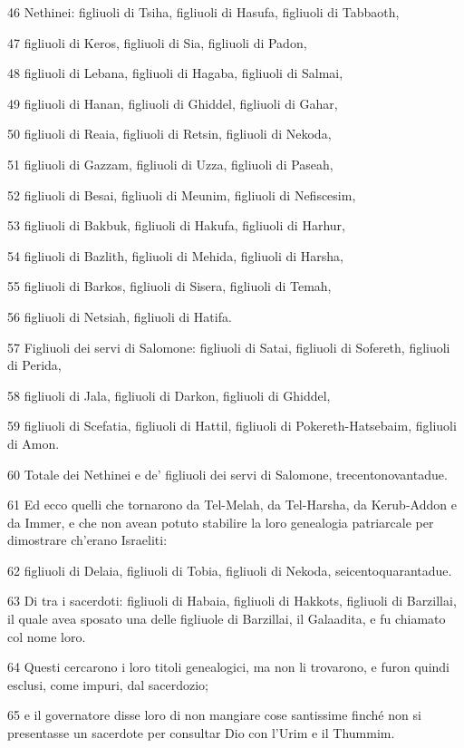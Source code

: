 \par 46 Nethinei: figliuoli di Tsiha, figliuoli di Hasufa, figliuoli di Tabbaoth,
\par 47 figliuoli di Keros, figliuoli di Sia, figliuoli di Padon,
\par 48 figliuoli di Lebana, figliuoli di Hagaba, figliuoli di Salmai,
\par 49 figliuoli di Hanan, figliuoli di Ghiddel, figliuoli di Gahar,
\par 50 figliuoli di Reaia, figliuoli di Retsin, figliuoli di Nekoda,
\par 51 figliuoli di Gazzam, figliuoli di Uzza, figliuoli di Paseah,
\par 52 figliuoli di Besai, figliuoli di Meunim, figliuoli di Nefiscesim,
\par 53 figliuoli di Bakbuk, figliuoli di Hakufa, figliuoli di Harhur,
\par 54 figliuoli di Bazlith, figliuoli di Mehida, figliuoli di Harsha,
\par 55 figliuoli di Barkos, figliuoli di Sisera, figliuoli di Temah,
\par 56 figliuoli di Netsiah, figliuoli di Hatifa.
\par 57 Figliuoli dei servi di Salomone: figliuoli di Satai, figliuoli di Sofereth, figliuoli di Perida,
\par 58 figliuoli di Jala, figliuoli di Darkon, figliuoli di Ghiddel,
\par 59 figliuoli di Scefatia, figliuoli di Hattil, figliuoli di Pokereth-Hatsebaim, figliuoli di Amon.
\par 60 Totale dei Nethinei e de' figliuoli dei servi di Salomone, trecentonovantadue.
\par 61 Ed ecco quelli che tornarono da Tel-Melah, da Tel-Harsha, da Kerub-Addon e da Immer, e che non avean potuto stabilire la loro genealogia patriarcale per dimostrare ch'erano Israeliti:
\par 62 figliuoli di Delaia, figliuoli di Tobia, figliuoli di Nekoda, seicentoquarantadue.
\par 63 Di tra i sacerdoti: figliuoli di Habaia, figliuoli di Hakkots, figliuoli di Barzillai, il quale avea sposato una delle figliuole di Barzillai, il Galaadita, e fu chiamato col nome loro.
\par 64 Questi cercarono i loro titoli genealogici, ma non li trovarono, e furon quindi esclusi, come impuri, dal sacerdozio;
\par 65 e il governatore disse loro di non mangiare cose santissime finché non si presentasse un sacerdote per consultar Dio con l'Urim e il Thummim.
